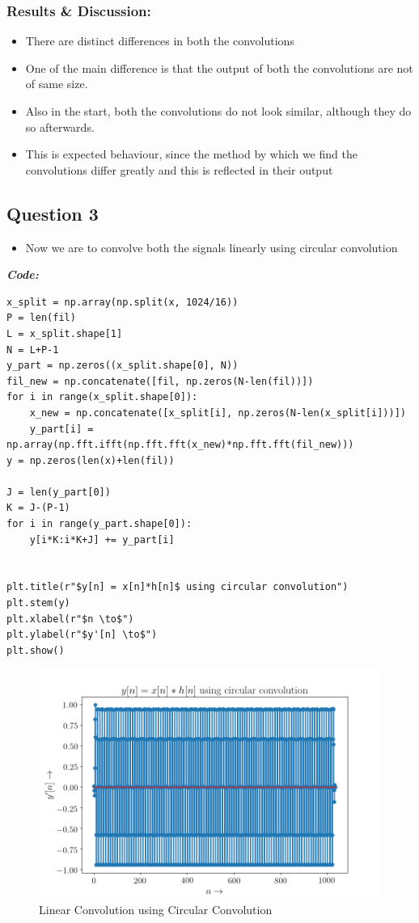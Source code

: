 \documentclass[11pt, a4paper]{article}
\begin{document}
\subsubsection{Results \& Discussion:}\label{results-discussion}
\begin{itemize}
  \item There are distinct differences in both the convolutions
  \item One of the main difference is that the output of both the convolutions are not of same size.
  \item Also in the start, both the convolutions do not look similar, although they do so afterwards.
  \item This is expected behaviour, since the method by which we find the convolutions differ greatly and this is reflected in their output
\end{itemize}
\newpage
\subsection{Question 3}
\begin{itemize}
  \item Now we are to convolve both the signals linearly using circular convolution
\end{itemize}
\textit{\textbf{Code:}}
\begin{lstlisting}
x_split = np.array(np.split(x, 1024/16))
P = len(fil)
L = x_split.shape[1]
N = L+P-1
y_part = np.zeros((x_split.shape[0], N))
fil_new = np.concatenate([fil, np.zeros(N-len(fil))])
for i in range(x_split.shape[0]):
    x_new = np.concatenate([x_split[i], np.zeros(N-len(x_split[i]))])
    y_part[i] = np.array(np.fft.ifft(np.fft.fft(x_new)*np.fft.fft(fil_new)))
y = np.zeros(len(x)+len(fil))

J = len(y_part[0])
K = J-(P-1)
for i in range(y_part.shape[0]):
    y[i*K:i*K+J] += y_part[i]


plt.title(r"$y[n] = x[n]*h[n]$ using circular convolution")
plt.stem(y)
plt.xlabel(r"$n \to$")
plt.ylabel(r"$y'[n] \to$")
plt.show()
\end{lstlisting}
\newpage
\begin{figure}[!tbh]
  \centering
  \includegraphics[scale=0.6]{./../Extras/a10-11.png}  %
  \caption{Linear Convolution using Circular Convolution}
\end{figure}
\newpage
\end{document}
